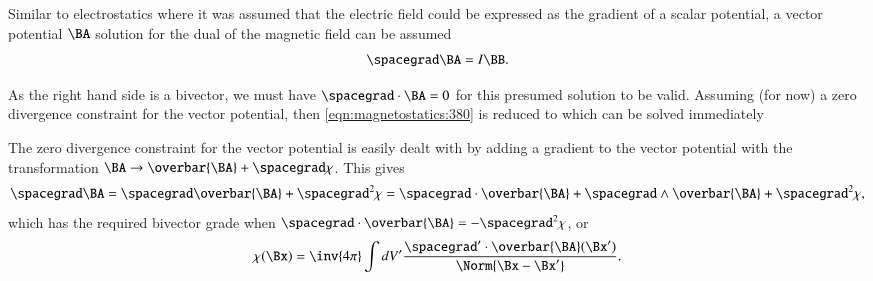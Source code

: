 %
%

Similar to electrostatics where it was assumed that the electric field could be expressed as the gradient of a scalar potential,
a vector potential \( \BA \) solution for the dual of the magnetic field can be assumed
\begin{dmath}\label{eqn:magnetostatics_vectorPotential:480}
\spacegrad \BA = I \BB.
\end{dmath}

As the right hand side is a bivector, we must have \( \spacegrad \cdot \BA = 0 \) for this presumed solution to be valid.
Assuming (for now) a zero divergence constraint for the vector potential, then \cref{eqn:magnetostatics:380} is reduced to
which can be solved immediately

The zero divergence constraint for the vector potential is easily dealt with by adding a gradient to the vector potential with the
transformation \( \BA \rightarrow \overbar{\BA} + \spacegrad \chi \).
This gives
\begin{dmath}\label{eqn:magnetostatics_vectorPotential:500}
\spacegrad \BA
=
\spacegrad \overbar{\BA} + \spacegrad^2 \chi
=
\spacegrad \cdot \overbar{\BA} + \spacegrad \wedge \overbar{\BA} + \spacegrad^2 \chi,
\end{dmath}
which has the required bivector grade when \( \spacegrad \cdot \overbar{\BA} = -\spacegrad^2 \chi \), or
\begin{dmath}\label{eqn:magnetostatics_vectorPotential:520}
\chi(\Bx) = \inv{4\pi} \int dV' \frac{ \spacegrad' \cdot \overbar{\BA}(\Bx') }{\Norm{\Bx - \Bx'}}.
\end{dmath}
